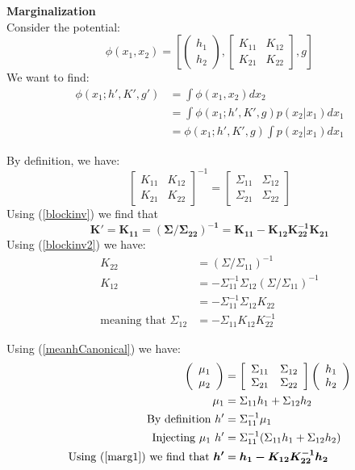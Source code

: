 \documentclass[11pt]{article}
\newcommand{\subsubsubsection}[1]{\noindent\textbf{#1}\\}
\begin{document}
\subsubsubsection{Marginalization}
Consider the potential:
$$
\phi(x_1, x_2) = \left[ \left( \begin{array}{c} h_1 \\ h_2 \end{array} \right), \left[ \begin{array}{cc} K_{11} & K_{12} \\ K_{21} & K_{22} \end{array} \right], g \right]
$$
We want to find:
\begin{align*}
\phi(x_1; h', K', g') &= \int \phi(x_1, x_2)dx_2\\
&= \int \phi(x_1; h', K', g)p(x_2|x_1)dx_1\\
&= \phi(x_1; h', K', g)\int p(x_2|x_1)dx_1
\end{align*}

By definition, we have:
$$
\left[ \begin{array}{cc} K_{11} & K_{12} \\ K_{21} & K_{22} \end{array} \right]^{-1} = \left[ \begin{array}{cc} \Sigma_{11} & \Sigma_{12} \\ \Sigma_{21} & \Sigma_{22} \end{array} \right]
$$
Using (\ref{blockinv}) we find that
$$\bm{K'=K_{11}=(\Sigma/\Sigma_{22})^{-1} = K_{11}-K_{12}K_{22}^{-1}K_{21}}$$
Using (\ref{blockinv2}) we have:
\begin{align}
K_{22} &= (\Sigma/\Sigma_{11})^{-1}\nonumber\\
K_{12} &= - \Sigma_{11}^{-1}\Sigma_{12}(\Sigma/\Sigma_{11})^{-1}\nonumber\\
&= - \Sigma_{11}^{-1}\Sigma_{12}K_{22}\nonumber\\
\text{meaning~that~} \Sigma_{12} &= -\Sigma_{11}K_{12}K_{22}^{-1}\label{marg1}
\end{align}

Using (\ref{meanhCanonical}) we have:
\begin{align*}
\left( \begin{array}{c} \mu_1 \\ \mu_2 \end{array} \right) &=
\left[ \begin{array}{cc} \Sigma_{11} & \Sigma_{12} \\ \Sigma_{21} & \Sigma_{22} \end{array} \right] \left( \begin{array}{c} h_1 \\ h_2 \end{array} \right) \\
\mu_1 &= \Sigma_{11}h_1 +  \Sigma_{12}h_2\\
\text{By definition~}h'&= \Sigma_{11}^{-1}\mu_1 \\
\text{Injecting~}\mu_1~h' &=\Sigma_{11}^{-1}(\Sigma_{11}h_1 +  \Sigma_{12}h_2)\\
\text{Using (\ref{marg1}) we find that~}\bm{h'} &= \bm{h_1 -K_{12}K_{22}^{-1}h_2}
\end{align*}
\end{document}
